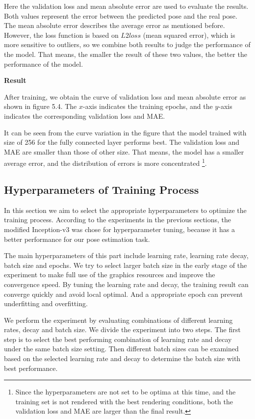 Here the validation loss and mean absolute error are used to evaluate the results. Both values represent the error between the predicted pose and the real pose. The mean absolute error describes the average error as mentioned before. However, the loss function is based on $L2 loss$ (mean squared error), which is more sensitive to outliers, so we combine both results to judge the performance of the model. That means, the smaller the result of these two values, the better the performance of the model.

\textbf{Result}

After training, we obtain the curve of validation loss and mean absolute error as shown in figure 5.4. The $x$-axis indicates the training epochs, and the $y$-axis indicates the corresponding validation loss and MAE.

\missingfigure{}

It can be seen from the curve variation in the figure that the model trained with size of 256 for the fully connected layer performs best. The validation loss and MAE are smaller than those of other size. That means, the model has a smaller average error, and the distribution of errors is more concentrated \footnote{Since the hyperparameters are not set to be optima at this time, and the training set is not rendered with the best rendering conditions, both the validation loss and MAE are larger than the final result.}. 


\subsection{Hyperparameters of Training Process}
In this section we aim to select the appropriate hyperparameters to optimize the training process. According to the experiments in the previous sections, the modified Inception-v3 was chose for hyperparameter tuning, because it has a better performance for our pose estimation task.

The main hyperparameters of this part include learning rate, learning rate decay, batch size and epochs. We try to select larger batch size in the early stage of the experiment to make full use of the graphics resources and improve the convergence speed. By tuning the learning rate and decay, the training result can converge quickly and avoid local optimal. And a appropriate epoch can prevent underfitting and overfitting.

We perform the experiment by evaluating combinations of different learning rates, decay and batch size. We divide the experiment into two steps. The first step is to select the best performing combination of learning rate and decay under the same batch size setting. Then different batch sizes can be examined based on the selected learning rate and decay to determine the batch size with best performance.

